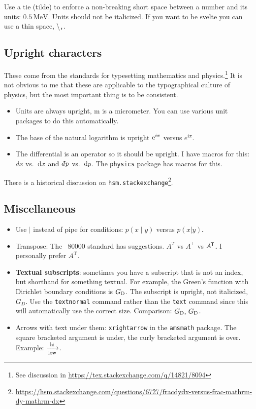 Use a tie (tilde) to enforce a non-breaking short space between a number and its units: $0.5~\text{MeV}$. Units should not be italicized. If you want to be svelte you can use a thin space, \textbackslash\texttt{,}.


\subsection{Upright characters}

These come from the  standards for typesetting mathematics and physics.\footnote{See discussion in \url{https://tex.stackexchange.com/q/14821/8094}} It is not obvious to me that these are applicable to the typographical culture of physics, but the most important thing is to be consistent.
\begin{itemize}
	\item Units are always upright, \textmu m is a micrometer. You can use various unit packages to do this automatically. 
	\item The base of the natural logarithm is upright $\e^{i\pi}$ versus $e^{i\pi}$.
	\item The differential is an operator so it should be upright. I have macros for this: $dx$ vs.~$\D{x}$ and $\dbar p$ vs.~$\Dbar{p}$. The \texttt{physics} package has macros for this. 
\end{itemize}
There is a historical discussion on \texttt{hsm.stackexchange}\footnote{\url{https://hsm.stackexchange.com/questions/6727/fracdydx-versus-frac-mathrm-dy-mathrm-dx}}.


\subsection{Miscellaneous}

\begin{itemize}
	\item Use $\mid$ instead of pipe for conditions: $p(x\mid y)$ versus $p(x|y)$.
	\item Transpose: The ~80000 standard has suggestions. $A^T$ vs $A^\top$ vs $A^{\trans}$. I personally prefer $A^\text{T}$.
	\item \textbf{Textual subscripts}: sometimes you have a subscript that is not an index, but shorthand for something textual. For example, the Green's function with Dirichlet boundary conditions is $G_\textnormal{D}$. The subscript is upright, not italicized, $G_D$. Use the \texttt{textnormal} command rather than the \texttt{text} command since this will automatically use the correct size. Comparison: $G_\textnormal{D},\, G_\text{D}$.
	\item Arrows with text under them: \texttt{xrightarrow} in the \texttt{amsmath} package. The square bracketed argument is under, the curly bracketed argument is over. Example: $\xrightarrow[\textnormal{low}]{\textnormal{hi}}$.
\end{itemize}



